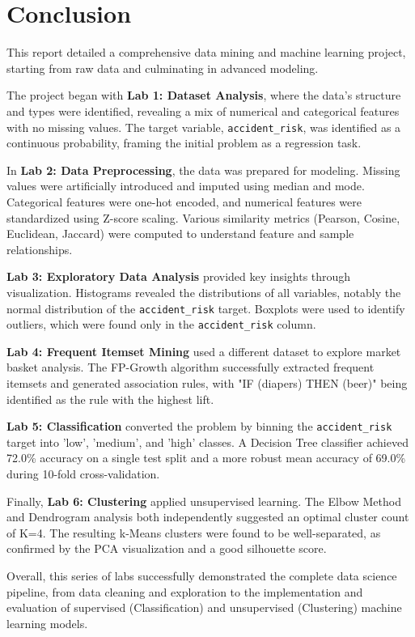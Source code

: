 \documentclass[12pt,a4paper]{article}
\begin{document}
\section{Conclusion}
This report detailed a comprehensive data mining and machine learning project, starting from raw data and culminating in advanced modeling.

The project began with \textbf{Lab 1: Dataset Analysis}, where the data's structure and types were identified, revealing a mix of numerical and categorical features with no missing values. The target variable, \texttt{accident\_risk}, was identified as a continuous probability, framing the initial problem as a regression task.

In \textbf{Lab 2: Data Preprocessing}, the data was prepared for modeling. Missing values were artificially introduced and imputed using median and mode. Categorical features were one-hot encoded, and numerical features were standardized using Z-score scaling. Various similarity metrics (Pearson, Cosine, Euclidean, Jaccard) were computed to understand feature and sample relationships.

\textbf{Lab 3: Exploratory Data Analysis} provided key insights through visualization. Histograms revealed the distributions of all variables, notably the normal distribution of the \texttt{accident\_risk} target. Boxplots were used to identify outliers, which were found only in the \texttt{accident\_risk} column.

\textbf{Lab 4: Frequent Itemset Mining} used a different dataset to explore market basket analysis. The FP-Growth algorithm successfully extracted frequent itemsets and generated association rules, with "IF (diapers) THEN (beer)" being identified as the rule with the highest lift.

\textbf{Lab 5: Classification} converted the problem by binning the \texttt{accident\_risk} target into 'low', 'medium', and 'high' classes. A Decision Tree classifier achieved 72.0\% accuracy on a single test split and a more robust mean accuracy of 69.0\% during 10-fold cross-validation.

Finally, \textbf{Lab 6: Clustering} applied unsupervised learning. The Elbow Method and Dendrogram analysis both independently suggested an optimal cluster count of K=4. The resulting k-Means clusters were found to be well-separated, as confirmed by the PCA visualization and a good silhouette score.

Overall, this series of labs successfully demonstrated the complete data science pipeline, from data cleaning and exploration to the implementation and evaluation of supervised (Classification) and unsupervised (Clustering) machine learning models.
\end{document}
